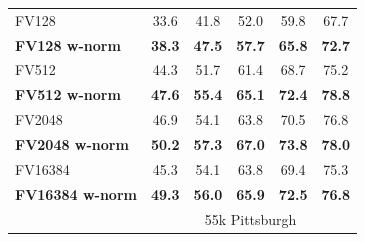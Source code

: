 \begin{table}[th!]
\begin{centering}
\begin{tabularx}{0.883\linewidth}{|l|c c c c c|}
        \rowcolor{maroon!10}
        FV128         & 33.6  & 41.8  & 52.0 & 59.8   & 67.7  \\
        \rowcolor{maroon!10}
        \textbf{FV128 w-norm}     & \textbf{38.3}   & \textbf{47.5} & \textbf{57.7} & \textbf{65.8} & \textbf{72.7}  \\
        \hline  
          \rowcolor{maroon!10}
          FV512         & 44.3 & 51.7   & 61.4  & 68.7   & 75.2  \\
          \rowcolor{maroon!10}
          \textbf{FV512 w-norm}   & \textbf{47.6}  & \textbf{55.4} & \textbf{65.1} & \textbf{72.4} & \textbf{78.8}  \\
          \hline
        \rowcolor{maroon!10}
        FV2048        & 46.9  & 54.1  & 63.8  & 70.5    & 76.8 \\
          \rowcolor{maroon!10}
          \textbf{FV2048 w-norm}  & \textbf{50.2} & \textbf{57.3} & \textbf{67.0} & \textbf{73.8} & \textbf{78.0} \\
          \hline
          \rowcolor{maroon!10}
        {FV16384}           &{45.3}     
                                  &{54.1}     
                                  &{63.8}     
                                  &{69.4}    
                                  &{75.3}   \\ 
          \rowcolor{maroon!10}
          {\textbf{FV16384 w-norm}}   &{\textbf{49.3}}      
                                  &{\textbf{56.0}}      
                                  &{\textbf{65.9}}      
                                  &{\textbf{72.5}}      
                                  &{\textbf{76.8}}  \\
        \hline
          \rowcolor{maroon!40}
          \multicolumn{1}{|c}{\quad} & \multicolumn{5}{c|}{55k Pittsburgh} \\

\end{tabularx}
\end{centering}
\end{table}
